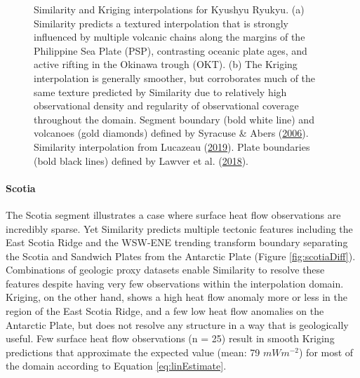 \begin{figure}[htbp]
\caption[Similarity and Kriging interpolations for Kyushyu Ryukyu]{Similarity and Kriging interpolations for Kyushyu Ryukyu. (a) Similarity predicts a textured interpolation that is strongly influenced by multiple volcanic chains along the margins of the Philippine Sea Plate (PSP), contrasting oceanic plate ages, and active rifting in the Okinawa trough (OKT). (b) The Kriging interpolation is generally smoother, but corroborates much of the same texture predicted by Similarity due to relatively high observational density and regularity of observational coverage throughout the domain. Segment boundary (bold white line) and volcanoes (gold diamonds) defined by Syracuse \& Abers (\protect\hyperlink{ref-syracuse2006}{2006}). Similarity interpolation from Lucazeau (\protect\hyperlink{ref-lucazeau2019}{2019}). Plate boundaries (bold black lines) defined by Lawver et al. (\protect\hyperlink{ref-lawver2018}{2018}).}\label{fig:kyushuRyukyuDiff}
\end{figure}

\hypertarget{scotia}{%
\paragraph{Scotia}\label{scotia}}

The Scotia segment illustrates a case where surface heat flow observations are incredibly sparse. Yet Similarity predicts multiple tectonic features including the East Scotia Ridge and the WSW-ENE trending transform boundary separating the Scotia and Sandwich Plates from the Antarctic Plate (Figure \ref{fig:scotiaDiff}). Combinations of geologic proxy datasets enable Similarity to resolve these features despite having very few observations within the interpolation domain. Kriging, on the other hand, shows a high heat flow anomaly more or less in the region of the East Scotia Ridge, and a few low heat flow anomalies on the Antarctic Plate, but does not resolve any structure in a way that is geologically useful. Few surface heat flow observations (n = 25) result in smooth Kriging predictions that approximate the expected value (mean: 79 \(mWm^{-2}\)) for most of the domain according to Equation \eqref{eq:linEstimate}.



